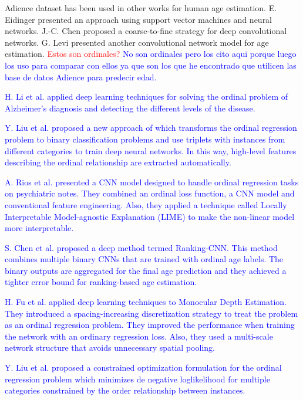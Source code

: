 \documentclass[journal]{IEEEtran}
\begin{document}
	Adience dataset has been used in other works for human age estimation. E. Eidinger \cite{eidinger2014age} presented an approach using support vector machines and neural networks. J.-C. Chen \cite{chen2016cascaded} proposed a coarse-to-fine strategy for deep convolutional networks. G. Levi \cite{levi2015age} presented another convolutional network model for age estimation. \textcolor{red}{Estos son ordinales?} \textcolor{blue}{No son ordinales pero los cito aqui porque luego los uso para comparar con ellos ya que son los que he encontrado que utilicen las base de datos Adience para predecir edad.}
	
	\textcolor{blue}{H. Li et al. \cite{li2017deep} applied deep learning techniques for solving the ordinal problem of Alzheimer's diagnosis and detecting the different levels of the disease.}
	
	\textcolor{blue}{Y. Liu et al. \cite{liu2017deep} proposed a new approach of which transforms the ordinal regression problem to binary classification problems and use triplets with instances from different categories to train deep neural networks. In this way, high-level features describing the ordinal relationship are extracted automatically.}
	
	\textcolor{blue}{A. Rios et al. \cite{rios2017ordinal} presented a CNN model designed to handle ordinal regression tasks on psychiatric notes. They combined an ordinal loss function, a CNN model and conventional feature engineering. Also, they applied a technique called Locally Interpretable Model-agnostic Explanation (LIME) to make the non-linear model more interpretable.}
	
	\textcolor{blue}{S. Chen et al. \cite{chen2017using} proposed a deep method termed Ranking-CNN. This method combines multiple binary CNNs that are trained with ordinal age labels. The binary outputs are aggregated for the final age prediction and they achieved a tighter error bound for ranking-based age estimation.}
	
	\textcolor{blue}{H. Fu et al. \cite{fu2018deep} applied deep learning techniques to Monocular Depth Estimation. They introduced a spacing-increasing discretization strategy to treat the problem as an ordinal regression problem. They improved the performance when training the network with an ordinary regression loss. Also, they used a multi-scale network structure that avoids unnecessary spatial pooling.}
	
	\textcolor{blue}{Y. Liu et al. \cite{liu2018constrained} proposed a constrained optimization formulation for the ordinal regression problem which minimizes de negative loglikelihood for multiple categories constrained by the order relationship between instances.}
	
\end{document}
